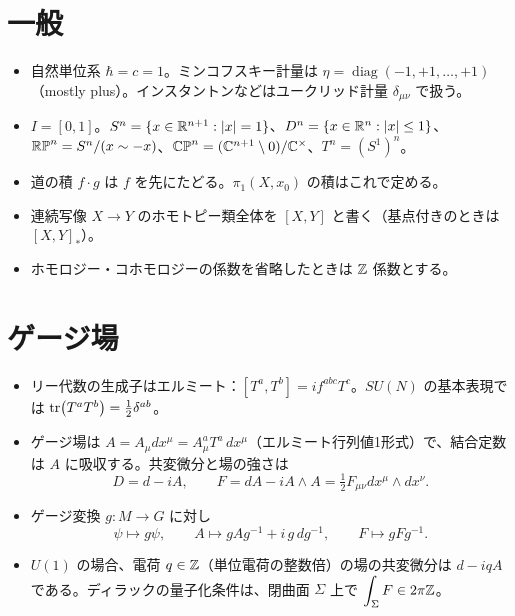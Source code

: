\section*{一般}
\begin{itemize}
  \item 自然単位系 $\hbar=c=1$。ミンコフスキー計量は $\eta=\operatorname{diag}(-1,+1,\dots,+1)$（mostly plus）。インスタントンなどはユークリッド計量 $\delta_{\mu\nu}$ で扱う。
  \item $I=[0,1]$。$S^n=\{x\in\mathbb{R}^{n+1}:\lvert x\rvert=1\}$、$D^n=\{x\in\mathbb{R}^n:\lvert x\rvert\le1\}$、$\mathbb{RP}^n=S^n/(x\sim-x)$、$\mathbb{CP}^n=(\mathbb{C}^{n+1}\setminus0)/\mathbb{C}^\times$、$T^n=(S^1)^n$。
  \item 道の積 $f\cdot g$ は $f$ を先にたどる。$\pi_1(X,x_0)$ の積はこれで定める。
  \item 連続写像 $X\to Y$ のホモトピー類全体を $[X,Y]$ と書く（基点付きのときは $[X,Y]_*$）。
  \item ホモロジー・コホモロジーの係数を省略したときは $\mathbb{Z}$ 係数とする。
\end{itemize}

\section*{ゲージ場}
\begin{itemize}
  \item リー代数の生成子はエルミート：$[T^a,T^b]=if^{abc}T^c$。$SU(N)$ の基本表現では $\tr(T^aT^b)=\tfrac12\delta^{ab}$。
  \item ゲージ場は $A=A_\mu dx^\mu=A_\mu^aT^a\,dx^\mu$（エルミート行列値1形式）で、結合定数は $A$ に吸収する。共変微分と場の強さは
  \[
  D=d-iA,\qquad F=dA-iA\wedge A=\tfrac12F_{\mu\nu}dx^\mu\wedge dx^\nu .
  \]
  \item ゲージ変換 $g\colon M\to G$ に対し
  \[
  \psi\mapsto g\psi,\qquad A\mapsto gAg^{-1}+i\,g\,dg^{-1},\qquad F\mapsto gFg^{-1}.
  \]
  \item $U(1)$ の場合、電荷 $q\in\mathbb{Z}$（単位電荷の整数倍）の場の共変微分は $d-iqA$ である。ディラックの量子化条件は、閉曲面 $\Sigma$ 上で $\displaystyle\int_\Sigma F\in2\pi\mathbb{Z}$。
\end{itemize}

